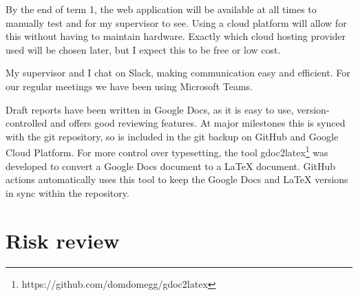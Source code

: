 \documentclass[a4paper,fleqn,12pt]{article}
\begin{document}
By the end of term 1, the web application will be available at all times to manually test and for my supervisor to see. Using a cloud platform will allow for this without having to maintain hardware. Exactly which cloud hosting provider used will be chosen later, but I expect this to be free or low cost.

My supervisor and I chat on Slack, making communication easy and efficient. For our regular meetings we have been using Microsoft Teams.

Draft reports have been written in Google Docs, as it is easy to use, version-controlled and offers good reviewing features. At major milestones this is synced with the git repository, so is included in the git backup on GitHub and Google Cloud Platform. For more control over typesetting, the tool gdoc2latex\footnote{https://github.com/domdomegg/gdoc2latex} was developed to convert a Google Docs document to a LaTeX document. GitHub actions automatically uses this tool to keep the Google Docs and LaTeX versions in sync within the repository.

\section{Risk review}\label{id:h.lkcg9956g3l}
\end{document}
